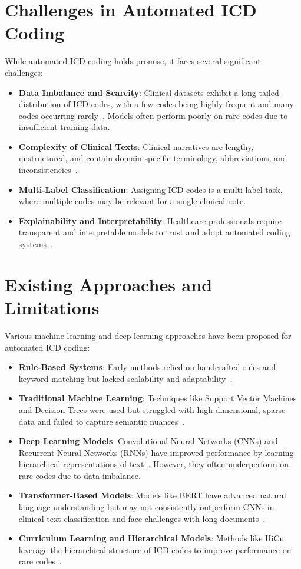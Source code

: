 \section{Challenges in Automated ICD Coding}
While automated ICD coding holds promise, it faces several significant challenges:
\begin{itemize}
    \item \textbf{Data Imbalance and Scarcity}: Clinical datasets exhibit a long-tailed distribution of ICD codes, with a few codes being highly frequent and many codes occurring rarely~\cite{rios2018few}. Models often perform poorly on rare codes due to insufficient training data.
    \item \textbf{Complexity of Clinical Texts}: Clinical narratives are lengthy, unstructured, and contain domain-specific terminology, abbreviations, and inconsistencies~\cite{wrenn2010quantifying}.
    \item \textbf{Multi-Label Classification}: Assigning ICD codes is a multi-label task, where multiple codes may be relevant for a single clinical note.
    \item \textbf{Explainability and Interpretability}: Healthcare professionals require transparent and interpretable models to trust and adopt automated coding systems~\cite{holzinger2017we}.
\end{itemize}

\section{Existing Approaches and Limitations}
Various machine learning and deep learning approaches have been proposed for automated ICD coding:
\begin{itemize}
    \item \textbf{Rule-Based Systems}: Early methods relied on handcrafted rules and keyword matching but lacked scalability and adaptability~\cite{farkas2008automatic}.
    \item \textbf{Traditional Machine Learning}: Techniques like Support Vector Machines and Decision Trees were used but struggled with high-dimensional, sparse data and failed to capture semantic nuances~\cite{perotte2014diagnosis}.
    \item \textbf{Deep Learning Models}: Convolutional Neural Networks (CNNs) and Recurrent Neural Networks (RNNs) have improved performance by learning hierarchical representations of text~\cite{mullenbach2018explainable, vu2020label}. However, they often underperform on rare codes due to data imbalance.
    \item \textbf{Transformer-Based Models}: Models like BERT have advanced natural language understanding but may not consistently outperform CNNs in clinical text classification and face challenges with long documents~\cite{dong2022automated, gao2021limitations}.
    \item \textbf{Curriculum Learning and Hierarchical Models}: Methods like HiCu leverage the hierarchical structure of ICD codes to improve performance on rare codes~\cite{ren2022hicu}.
\end{itemize}

